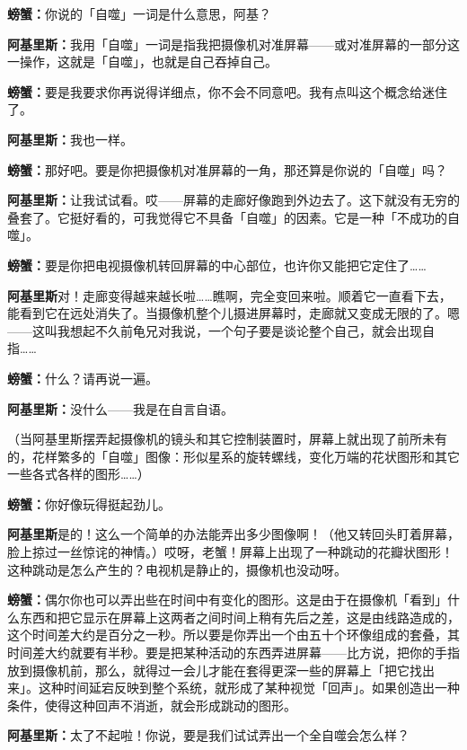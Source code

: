 \documentclass[
  12pt,
  twoside,
  openright,
  oldfontcommands,
]{memoir}
\newcommand{\kaitismall}[1]{{\kaitifamily\small #1}}
\newcommand{\dialogname}[1]{{\heifamily\bfseries #1}}
\begin{document}
\dialogname{螃蟹：}你说的「自噬」一词是什么意思，阿基？

\dialogname{阿基里斯：}我用「自噬」一词是指我把摄像机对准屏幕------或对准屏幕的一部分这一操作，这就是「自噬」，也就是自己吞掉自己。

\dialogname{螃蟹：}要是我要求你再说得详细点，你不会不同意吧。我有点叫这个概念给迷住了。

\dialogname{阿基里斯：}我也一样。

\dialogname{螃蟹：}那好吧。要是你把摄像机对准屏幕的一角，那还算是你说的「自噬」吗？

\dialogname{阿基里斯：}让我试试看。哎------屏幕的走廊好像跑到外边去了。这下就没有无穷的叠套了。它挺好看的，可我觉得它不具备「自噬」的因素。它是一种「不成功的自噬」。

\dialogname{螃蟹：}要是你把电视摄像机转回屏幕的中心部位，也许你又能把它定住了\ldots\ldots{}

\dialogname{阿基里斯}对！走廊变得越来越长啦\ldots\ldots 瞧啊，完全变回来啦。顺着它一直看下去，能看到它在远处消失了。当摄像机整个儿摄进屏幕时，走廊就又变成无限的了。嗯------这叫我想起不久前龟兄对我说，一个句子要是谈论整个自己，就会出现自指\ldots\ldots{}

\dialogname{螃蟹：}什么？请再说一遍。

\dialogname{阿基里斯：}没什么------我是在自言自语。

（当阿基里斯摆弄起摄像机的镜头和其它控制装置时，屏幕上就出现了前所未有的，花样繁多的「自噬」图像：形似星系的旋转螺线，变化万端的花状图形和其它一些各式各样的图形\ldots\ldots）

\dialogname{螃蟹：}你好像玩得挺起劲儿。

\dialogname{阿基里斯}是的！这么一个简单的办法能弄出多少图像啊！\kaitismall{（他又转回头盯着屏幕，脸上掠过一丝惊诧的神情。）}哎呀，老蟹！屏幕上出现了一种跳动的花瓣状图形！这种跳动是怎么产生的？电视机是静止的，摄像机也没动呀。

\dialogname{螃蟹：}偶尔你也可以弄出些在时间中有变化的图形。这是由于在摄像机「看到」什么东西和把它显示在屏幕上这两者之间时间上稍有先后之差，这是由线路造成的，这个时间差大约是百分之一秒。所以要是你弄出一个由五十个环像组成的套叠，其时间差大约就要有半秒。要是把某种活动的东西弄进屏幕------比方说，把你的手指放到摄像机前，那么，就得过一会儿才能在套得更深一些的屏幕上「把它找出来」。这种时间延宕反映到整个系统，就形成了某种视觉「回声」。如果创造出一种条件，使得这种回声不消逝，就会形成跳动的图形。

\dialogname{阿基里斯：}太了不起啦！你说，要是我们试试弄出一个全自噬会怎么样？
\end{document}
